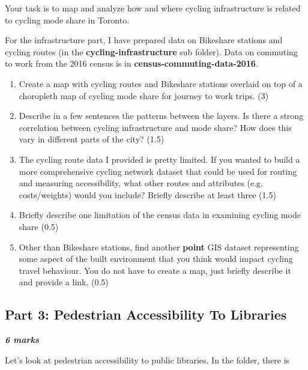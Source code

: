 \documentclass[11pt]{article}
\begin{document}
	Your task is to map and analyze how and where cycling infrastructure is related to cycling mode share in Toronto. 

	For the infrastructure part, I have prepared data on Bikeshare stations and cycling routes (in the \textbf{cycling-infrastructure} sub folder). Data on commuting to work from the 2016 census is in \textbf{census-commuting-data-2016}.

	\begin{enumerate}
			
		\item Create a map with cycling routes and Bikeshare stations overlaid on top of a choropleth map of cycling mode share for journey to work trips. (3)
		
		\item Describe in a few sentences the patterns between the layers. Is there a strong correlation between cycling infrastructure and mode share? How does this vary in different parts of the city? (1.5)
		
		\item The cycling route data I provided is pretty limited. If you wanted to build a more comprehensive cycling network dataset that could be used for routing and measuring accessibility, what other routes and attributes (e.g. costs/weights) would you include?  Briefly describe at least three (1.5)
				
		\item Briefly describe one limitation of the census data in examining cycling mode share (0.5)
		
		\item Other than Bikeshare stations, find another \textbf{point} GIS dataset representing some aspect of the built environment that you think would impact cycling travel behaviour. You do not have to create a map, just briefly describe it and provide a link. (0.5)
		
	\end{enumerate}
	
	
	
	
	
	
	\subsection*{Part 3: Pedestrian Accessibility To Libraries} 
	
	\vspace{-2mm}
	\textbf{\textit{6 marks}}
	
	Let's look at pedestrian accessibility to public libraries. In the  folder, there is 
	
\end{document}
